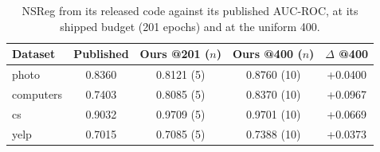 \begin{table}[t]
\centering
\small
\begin{tabular}{lcccc}
\toprule
Dataset & Published & Ours @201 ($n$) & Ours @400 ($n$) & $\Delta$ @400 \\
\midrule
photo & 0.8360 & 0.8121 (5) & 0.8760 (10) & +0.0400 \\
computers & 0.7403 & 0.8085 (5) & 0.8370 (10) & +0.0967 \\
cs & 0.9032 & 0.9709 (5) & 0.9701 (10) & +0.0669 \\
yelp & 0.7015 & 0.7085 (5) & 0.7388 (10) & +0.0373 \\
\bottomrule
\end{tabular}
\caption{NSReg from its released code against its published AUC-ROC, at its shipped budget (201 epochs) and at the uniform 400.}
\label{tab:nsreg_repro}
\end{table}
